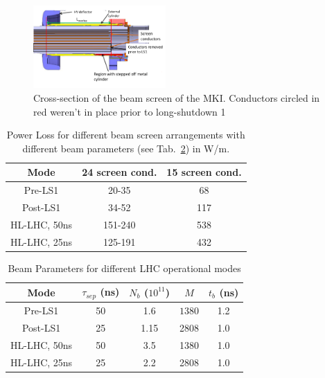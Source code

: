 \documentclass[a4paper,
              ]{jacow}
\begin{document}
\begin{figure}
\begin{center}
\includegraphics[width=0.45\textwidth]{MOPJE038f1.pdf}
\caption{Cross-section of the beam screen of the MKI. Conductors circled in red weren't in place prior to long-shutdown 1}
\label{fig:BeamScreenPostLS1}
\end{center}
\end{figure}

\begin{table}
\caption{Power Loss for different beam screen arrangements with different beam parameters (see Tab.~\ref{tab:beamPara}) in W/m.}
\label{tab:PowLoss}
\begin{center}
\begin{tabular}{c | c | c}
Mode & 24 screen cond. & 15 screen cond. \\ \hline 
Pre-LS1 & 20-35 & 68 \\ \hline 
Post-LS1 & 34-52 & 117 \\ \hline 
HL-LHC, 50ns & 151-240 & 538  \\ \hline 
HL-LHC, 25ns & 125-191 & 432  \\ 
\end{tabular}
\end{center}
\end{table}

\begin{table}
\caption{Beam Parameters for different LHC operational modes}
\label{tab:beamPara}
\begin{center}
\begin{tabular}{c | c | c | c | c}
Mode & $\tau_{sep}$ (ns) & $N_{b}$ ($10^{11}$) & $ M $ & $t_{b}$ (ns) \\ \hline 
Pre-LS1 & 50 & 1.6 & $ 1380 $ & 1.2 \\ \hline 
Post-LS1 & 25 & 1.15 & 2808 & 1.0 \\ \hline 
HL-LHC, 50ns & 50 & 3.5 & 1380 & 1.0 \\ \hline 
HL-LHC, 25ns & 25 & 2.2 & 2808 & 1.0 \\ 
\end{tabular}
\end{center}
\end{table}
\end{document}
